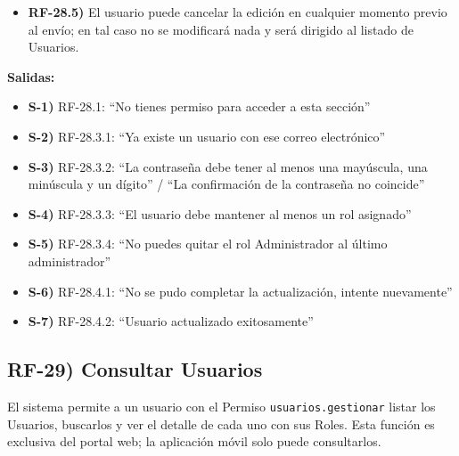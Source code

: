 \begin{itemize}[label={}, leftmargin=1.5em]
  \begin{itemize}[label={}, leftmargin=1.5em]
    \item \textbf{RF-28.4.1)} Si la operaci\'on falla, no se modificar\'a nada (rollback) y se notificar\'a: ``No se pudo completar la actualizaci\'on, intente nuevamente''.
    \item \textbf{RF-28.4.2)} Si se completa, se desplegar\'a el mensaje: ``Usuario actualizado exitosamente'' y el usuario ser\'a dirigido al listado de Usuarios (RF-29).
  \end{itemize}
  \item \textbf{RF-28.5)} El usuario puede cancelar la edici\'on en cualquier momento previo al env\'io; en tal caso no se modificar\'a nada y ser\'a dirigido al listado de Usuarios.
\end{itemize}

\textbf{Salidas:}
\begin{itemize}[label={}, leftmargin=1.5em]
  \item \textbf{S-1)} RF-28.1: ``No tienes permiso para acceder a esta secci\'on''
  \item \textbf{S-2)} RF-28.3.1: ``Ya existe un usuario con ese correo electr\'onico''
  \item \textbf{S-3)} RF-28.3.2: ``La contrase\~na debe tener al menos una may\'uscula, una min\'uscula y un d\'igito'' / ``La confirmaci\'on de la contrase\~na no coincide''
  \item \textbf{S-4)} RF-28.3.3: ``El usuario debe mantener al menos un rol asignado''
  \item \textbf{S-5)} RF-28.3.4: ``No puedes quitar el rol Administrador al \'ultimo administrador''
  \item \textbf{S-6)} RF-28.4.1: ``No se pudo completar la actualizaci\'on, intente nuevamente''
  \item \textbf{S-7)} RF-28.4.2: ``Usuario actualizado exitosamente''
\end{itemize}

\subsection*{RF-29) Consultar Usuarios}
El sistema permite a un usuario con el Permiso \texttt{usuarios.gestionar} listar los Usuarios, buscarlos y ver el detalle de cada uno con sus Roles. Esta funci\'on es exclusiva del portal web; la aplicaci\'on m\'ovil solo puede consultarlos.

